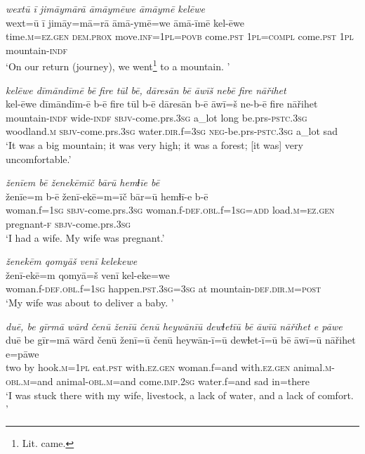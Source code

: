 \ea \label{ZQ.11}
\textit{wextū ī jimāymārā āmāymēwe āmāymē kelēwe} \\ 
\gll wext=ū ī jimāy=mā=rā āmā-ymē=we āmā-īmē kel-ēwe \\ 
 time\textsc{.m}\textsc{=ez.gen} \textsc{dem.prox} move\textsc{.inf}\textsc{=\textsc{1pl}}\textsc{=\textsc{povb}} come\textsc{.pst} \textsc{1pl}\textsc{=compl} come\textsc{.pst} \textsc{1pl} mountain\textsc{-indf} \\ 
\glt `On our return (journey), we went\footnote{Lit. came.}  to a mountain. '
\z 
 
\ea \label{ZQ.12}
\textit{kelēwe dīmāndīmē bē fire tūl bē, dāresān bē āwīš nebē fire nāřihet} \\ 
\gll kel-ēwe dīmāndīm-ē b-ē fire tūl b-ē dāresān b-ē āwī=š ne-b-ē fire nāřihet \\ 
 mountain\textsc{-indf} wide\textsc{-indf} \textsc{sbjv-}come.prs\textsc{.3sg} a\_lot long be.prs\textsc{-pstc}\textsc{.3sg} woodland\textsc{.m} \textsc{sbjv-}come.prs\textsc{.3sg} water\textsc{.dir}.f\textsc{=3sg} \textsc{neg-}be.prs\textsc{-pstc}\textsc{.3sg} a\_lot sad \\ 
\glt `It was a big mountain; it was very high; it was a forest; [it was] very uncomfortable.'
\z 
 
\ea \label{ZQ.13}
\textit{ženīem bē ženekēmīč bārū hemɫīe bē} \\ 
\gll ženīe=m b-ē ženī-ekē=m=īč bār=ū hemɫī-e b-ē \\ 
 woman.f\textsc{=\textsc{1sg}} \textsc{sbjv-}come.prs\textsc{.3sg} woman.f\textsc{-def}\textsc{.obl}.f\textsc{=\textsc{1sg}}\textsc{=add} load\textsc{.m}\textsc{=ez.gen} pregnant\textsc{-f} \textsc{sbjv-}come.prs\textsc{.3sg} \\ 
\glt `I had a wife. My wife was pregnant.'
\z 
 
\ea \label{ZQ.14}
\textit{ženekēm qomyāš venī kelekewe} \\ 
\gll ženī-ekē=m qomyā=š venī kel-eke=we \\ 
 woman.f\textsc{-def}\textsc{.obl}.f\textsc{=\textsc{1sg}} happen\textsc{.pst}\textsc{.3sg}\textsc{=3sg} at mountain\textsc{-def}\textsc{.dir}\textsc{.m}\textsc{=\textsc{post}} \\ 
\glt `My wife was about to deliver a baby. '
\z 
 
\ea \label{ZQ.16}
\textit{duē, be gīrmā wārd čenū ženīū čenū heywānīū dewɫetīū bē āwīū nāřihet e pāwe} \\ 
\gll duē be gīr=mā wārd čenū ženī=ū čenū heywān-ī=ū dewɫet-ī=ū bē āwī=ū nāřihet e=pāwe \\ 
 two by hook\textsc{.m}\textsc{=\textsc{1pl}} eat\textsc{.pst} with\textsc{.ez.gen} woman.f=and with\textsc{.ez.gen} animal\textsc{.m}\textsc{-obl}\textsc{.m}=and animal\textsc{-obl}\textsc{.m}=and come\textsc{.imp}\textsc{.\textsc{2sg}} water.f=and sad in=there \\ 
\glt `I was stuck there with my wife, livestock, a lack of water, and a lack of comfort. '
\z 
 
